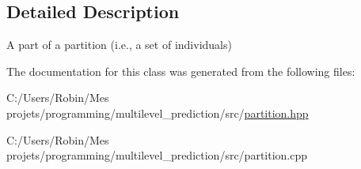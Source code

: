 \subsection{Detailed Description}
A part of a partition (i.\+e., a set of individuals) 

The documentation for this class was generated from the following files\+:\begin{DoxyCompactItemize}
\item 
C\+:/\+Users/\+Robin/\+Mes projets/programming/multilevel\+\_\+prediction/src/\hyperlink{partition_8hpp}{partition.\+hpp}\item 
C\+:/\+Users/\+Robin/\+Mes projets/programming/multilevel\+\_\+prediction/src/partition.\+cpp\end{DoxyCompactItemize}
